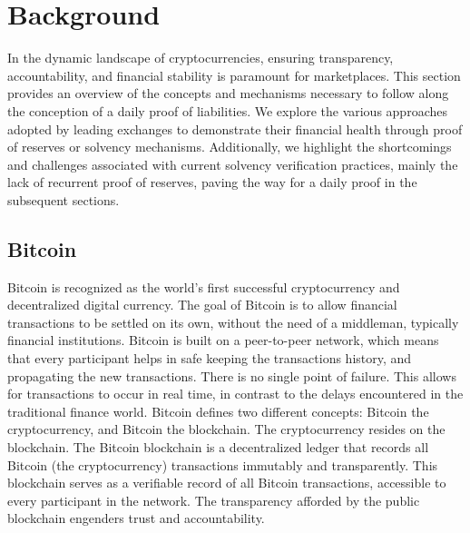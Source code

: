 

\chapter{Background}


In the dynamic landscape of cryptocurrencies, ensuring transparency, accountability, and financial stability
is paramount for marketplaces. This section provides an overview of the concepts and mechanisms
necessary to follow along the conception of a daily proof of liabilities. We explore the various approaches adopted by leading exchanges
 to demonstrate their financial health through proof of reserves or solvency mechanisms. Additionally, we
 highlight the shortcomings and challenges associated with current solvency verification practices, mainly the lack of recurrent proof of reserves,
  paving the way for a daily proof in the subsequent sections.


\section{Bitcoin}


Bitcoin is recognized as the world's first successful cryptocurrency and decentralized digital currency.
The goal of Bitcoin is to allow financial transactions to be settled on its own, without the need of a middleman, typically financial institutions.
Bitcoin is built on a peer-to-peer network, which means that every participant helps in safe keeping the transactions history, and propagating the new transactions.
There is no single point of failure. This allows for transactions to occur in real time, in contrast to the delays encountered in the traditional finance world.
Bitcoin defines two different concepts: Bitcoin the cryptocurrency, and Bitcoin the blockchain. The cryptocurrency resides on the blockchain.
The Bitcoin blockchain is a decentralized ledger that records all Bitcoin (the cryptocurrency) transactions immutably and transparently.
This blockchain serves as a verifiable record of all Bitcoin transactions, accessible to every participant in the network.
The transparency afforded by the public blockchain engenders trust and accountability.





